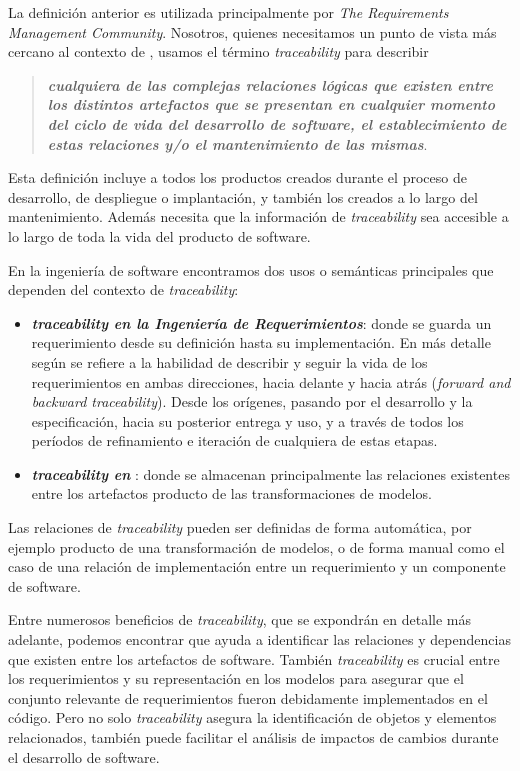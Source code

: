 \documentclass[a4paper,12pt,oneside,spanish]{book}
\begin{document}
La definición anterior es utilizada principalmente por \textit{The Requirements Management Community}. Nosotros, quienes necesitamos un punto de vista más cercano al contexto de , usamos el término \textit{traceability} para describir 
\begin{quote}
\small \textit{\textbf{cualquiera de las complejas relaciones lógicas que existen entre los distintos artefactos que se presentan en cualquier momento del ciclo de vida del desarrollo de software, el establecimiento de estas relaciones y/o el mantenimiento de las mismas}}.
\end{quote}

Esta definición incluye a todos los productos creados durante el proceso de desarrollo, de despliegue o implantación, y también los creados a lo largo del mantenimiento. Además necesita que la información de \textit{traceability} sea accesible a lo largo de toda la vida del producto de software.


En la ingeniería de software encontramos dos usos o semánticas principales que dependen del contexto de \textit{traceability}:

\begin{itemize}

\item \textit{\textbf{traceability en la Ingeniería de Requerimientos}}: donde se guarda un requerimiento desde su definición hasta su implementación. En más detalle según \cite{GotelFinkelstein} se refiere a la habilidad de describir y seguir la vida de los requerimientos en ambas direcciones, hacia delante y hacia atrás (\textit{forward and backward traceability}). Desde los orígenes, pasando por el desarrollo y la especificación, hacia su posterior entrega y uso, y a través de todos los períodos de refinamiento e iteración de cualquiera de estas etapas.

\item \textit{\textbf{traceability en }}: donde se almacenan principalmente las relaciones existentes entre los artefactos producto de las transformaciones de modelos.

\end{itemize}


Las relaciones de \textit{traceability} pueden ser definidas de forma automática, por ejemplo producto de una transformación de modelos, o de forma manual como el caso de una relación de implementación entre un requerimiento y un componente de software.

Entre numerosos beneficios de \textit{traceability}, que se expondrán en detalle más adelante, podemos encontrar que ayuda a identificar las relaciones y dependencias que existen entre los artefactos de software. También \textit{traceability} es crucial entre los requerimientos y su representación en los modelos para asegurar que el conjunto relevante de requerimientos fueron debidamente implementados en el código. Pero no solo \textit{traceability} asegura la identificación de objetos y elementos relacionados, también puede facilitar el análisis de impactos de cambios durante el desarrollo de software.
\end{document}
